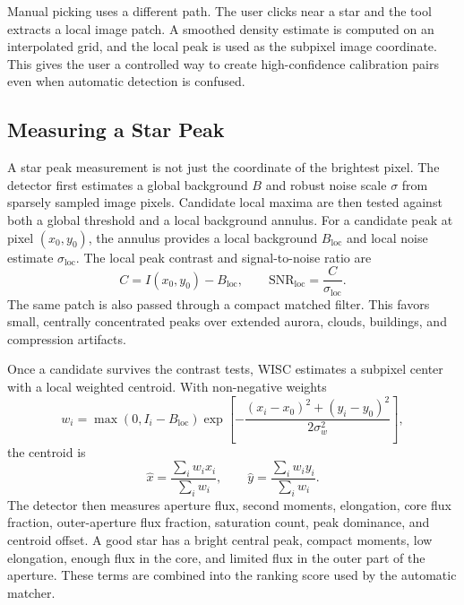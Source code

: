 \documentclass[11pt]{article}
\begin{document}
Manual picking uses a different path. The user clicks near a star and the tool
extracts a local image patch. A smoothed density estimate is computed on an
interpolated grid, and the local peak is used as the subpixel image coordinate.
This gives the user a controlled way to create high-confidence calibration
pairs even when automatic detection is confused.

\subsection{Measuring a Star Peak}

A star peak measurement is not just the coordinate of the brightest pixel. The
detector first estimates a global background \(B\) and robust noise scale
\(\sigma\) from sparsely sampled image pixels. Candidate local maxima are then
tested against both a global threshold and a local background annulus. For a
candidate peak at pixel \((x_0,y_0)\), the annulus provides a local background
\(B_{\mathrm{loc}}\) and local noise estimate \(\sigma_{\mathrm{loc}}\). The
local peak contrast and signal-to-noise ratio are
\begin{equation}
  C = I(x_0,y_0)-B_{\mathrm{loc}},
  \qquad
  \mathrm{SNR}_{\mathrm{loc}} = \frac{C}{\sigma_{\mathrm{loc}}}.
\end{equation}
The same patch is also passed through a compact matched filter. This favors
small, centrally concentrated peaks over extended aurora, clouds, buildings,
and compression artifacts.

Once a candidate survives the contrast tests, WISC estimates a subpixel center
with a local weighted centroid. With non-negative weights
\begin{equation}
  w_i =
  \max\left(0, I_i-B_{\mathrm{loc}}\right)
  \exp\left[-\frac{(x_i-x_0)^2+(y_i-y_0)^2}{2\sigma_w^2}\right],
\end{equation}
the centroid is
\begin{equation}
  \hat{x} = \frac{\sum_i w_i x_i}{\sum_i w_i},
  \qquad
  \hat{y} = \frac{\sum_i w_i y_i}{\sum_i w_i}.
\end{equation}
The detector then measures aperture flux, second moments, elongation, core flux
fraction, outer-aperture flux fraction, saturation count, peak dominance, and
centroid offset. A good star has a bright central peak, compact moments, low
elongation, enough flux in the core, and limited flux in the outer part of the
aperture. These terms are combined into the ranking score used by the automatic
matcher.
\end{document}
